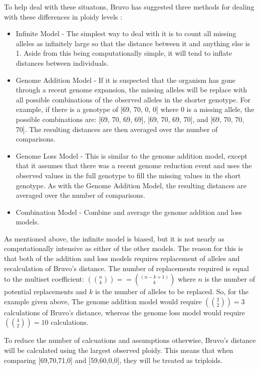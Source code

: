 \documentclass[letterpaper]{article}\usepackage[]{graphicx}\usepackage[]{color}
\begin{document}
To help deal with these situatons, Bruvo has suggested three methods for dealing with these differences in ploidy levels \cite{Bruvo:2004}:
\begin{itemize}
  \item{Infinite Model -} The simplest way to deal with it is to count all missing alleles as infinitely large so that the distance between it and anything else is 1. Aside from this being computationally simple, it will tend to inflate distances between individuals. 
  \item{Genome Addition Model -} If it is suspected that the organism has gone through a recent genome expansion, the missing alleles will be replace with all possible combinations of the observed alleles in the shorter genotype. For example, if there is a genotype of [69, 70, 0, 0] where 0 is a missing allele, the possible combinations are: [69, 70, 69, 69], [69, 70, 69, 70], and [69, 70, 70, 70]. The resulting distances are then averaged over the number of comparisons. 
  \item{Genome Loss Model -} This is similar to the genome addition model, except that it assumes that there was a recent genome reduction event and uses the observed values in the full genotype to fill the missing values in the short genotype. As with the Genome Addition Model, the resulting distances are averaged over the number of comparisons.
  \item{Combination Model -} Combine and average the genome addition and loss models.
\end{itemize}

As mentioned above, the infinite model is biased, but it is not nearly as computationally intensive as either of the other models. The reason for this is that both of the addition and loss models requires replacement of alleles and recalculation of Bruvo's distance. The number of replacements required is equal to the multiset coefficient: $\left({n \choose k}\right) == {(n-k+1) \choose k}$ where $n$ is the number of potential replacements and $k$ is the number of alleles to be replaced. So, for the example given above, The genome addition model would require $\left({2 \choose 2}\right) = 3$ calculations of Bruvo's distance, whereas the genome loss model would require $\left({4 \choose 2}\right) = 10$ calculations. 

To reduce the number of calcuations and assumptions otherwise, Bruvo's distance will be calculated using the largest observed ploidy. This means that when comparing [69,70,71,0] and [59,60,0,0], they will be treated as triploids.
\end{document}
